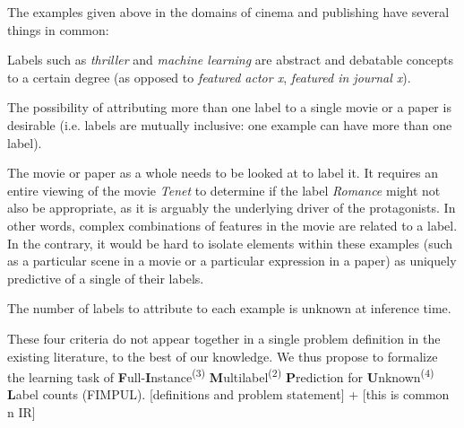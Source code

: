 The examples given above in the domains of cinema and publishing have several things in common: 
\begin{enumerate*}[label=(\arabic*)]
\item Labels such as \textit{thriller} and \textit{machine learning} are abstract and
debatable concepts to a certain degree (as opposed to \textit{featured actor
x}, \textit{featured in journal x}). 
\item The possibility of attributing more than one label to a single movie or a paper is desirable (i.e. labels are
mutually inclusive: one example can have more than one label). 
\item The movie or paper as a whole needs to be looked at to label it. It requires an entire
viewing of the movie \textit{Tenet} to determine if the label \textit{Romance}
might not also be appropriate, as it is arguably the underlying driver of the
protagonists. In other words, complex combinations of features in the movie
are related to a label. In the contrary, it would be hard to isolate elements
within these examples (such as a particular scene in a movie or a particular
expression in a paper) as uniquely predictive of a single of their labels.
\item The number of labels to attribute to each example is unknown at inference
time.
\end{enumerate*}


These four criteria do not appear together in a single problem definition in the existing literature, to the best of our knowledge. We thus propose to formalize the learning task of \textbf{F}ull-\textbf{I}nstance\textsuperscript{(3)} \textbf{M}ultilabel\textsuperscript{(2)} \textbf{P}rediction for \textbf{U}nknown\textsuperscript{(4)} \textbf{L}abel counts (FIMPUL). [definitions and problem statement] + [this is common n IR]


